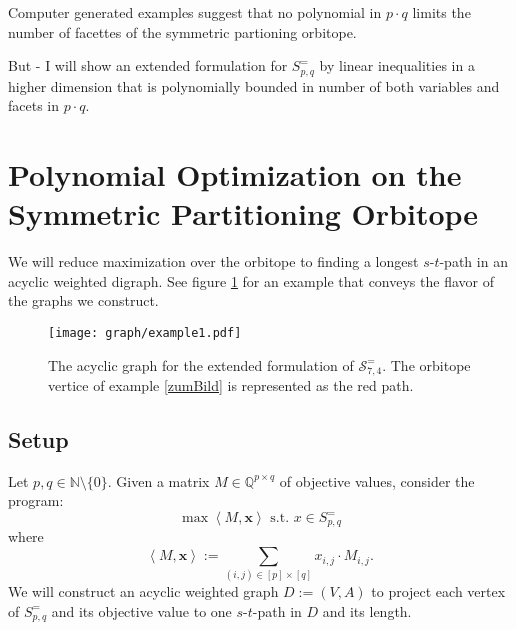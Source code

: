 \documentclass[a4paper]{amsart}
\theoremstyle{lemma}
\theoremstyle{definition}
\theoremstyle{remark}
\theoremstyle{example}
\newcommand{\lrX}[1]{\ensuremath{\left< #1 \right>}}
\newcommand{\M}{\ensuremath{\mathcal{M}}}
\newcommand{\calS}{\ensuremath{\mathcal{S}}}
\begin{document}

Computer generated examples suggest that no polynomial in \(p \cdot
q\) limits the number of facettes of the symmetric partioning
orbitope.

But - I will show an extended formulation for \(S^=_{p, q}\) by linear
inequalities in a higher dimension that is polynomially bounded in
number of both variables and facets in \(p \cdot q\).



\section{Polynomial Optimization on the  Symmetric Partitioning
  Orbitope}
\label{fluss}
We will reduce maximization over the orbitope to finding a longest
\(s\)-\(t\)-path in an acyclic weighted digraph.  See figure
\ref{example1graph} for an example that conveys the flavor of the
graphs we construct.

\begin{figure}
\texttt{[image: graph/example1.pdf]}
\caption{The acyclic graph for the extended formulation of
  \(\calS^=_{7, 4}\).  The orbitope vertice of example \ref{zumBild}
  is represented as the red path.}
\label{example1graph}
\end{figure}

\subsection{Setup}

Let \(p, q \in \mathbb{N} \setminus \{0\}\).  Given a matrix \(M \in
\mathbb{Q}^{p \times q}\) of objective values, consider the program:
\begin{equation}
\label{optS}
\max \lrX{M, \mathbf{x} }  \text{ s.t. } x \in S^=_{p, q}
\end{equation}
where \[\lrX{M, \mathbf{x} } := \sum_{(i, j)\in [p]\times [q]} x_{i, j}\cdot M_{i, j}\text{.}\]
We will construct an acyclic weighted graph \(D := (V, A)\) to project each vertex of
\(S^=_{p, q}\) and its objective value to one \(s\)-\(t\)-path in \(D\) and its length.
\end{document}
